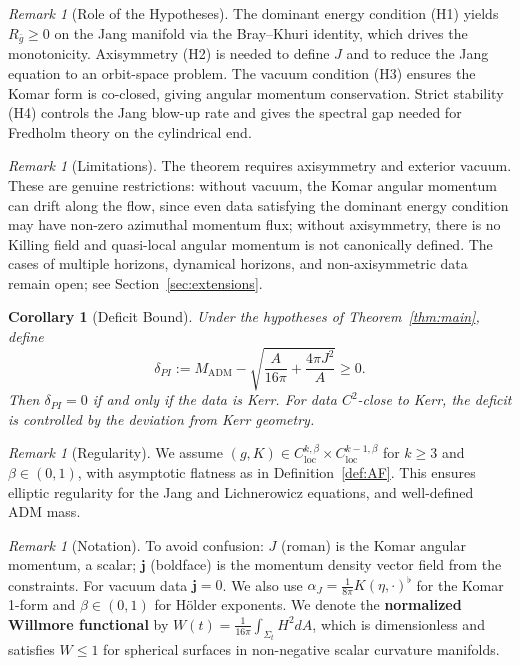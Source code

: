 \documentclass[12pt]{article}
\theoremstyle{plain}
\newtheorem{corollary}[theorem]{Corollary}
\theoremstyle{definition}
\theoremstyle{remark}
\newtheorem{remark}[theorem]{Remark}
\newcommand{\ADM}{\mathrm{ADM}}
\newcommand{\bg}{\bar{g}}
\newcommand{\momdens}{\boldsymbol{j}}
\begin{document}
\begin{remark}[Role of the Hypotheses]\label{rem:hypothesis-role}
The dominant energy condition (H1) yields $R_{\bg}\ge 0$ on the Jang manifold via the Bray--Khuri identity, which drives the monotonicity. Axisymmetry (H2) is needed to define $J$ and to reduce the Jang equation to an orbit-space problem. The vacuum condition (H3) ensures the Komar form is co-closed, giving angular momentum conservation. Strict stability (H4) controls the Jang blow-up rate and gives the spectral gap needed for Fredholm theory on the cylindrical end.
\end{remark}

\begin{remark}[Limitations]\label{rem:scope}
The theorem requires axisymmetry and exterior vacuum. These are genuine restrictions: without vacuum, the Komar angular momentum can drift along the flow, since even data satisfying the dominant energy condition may have non-zero azimuthal momentum flux; without axisymmetry, there is no Killing field and quasi-local angular momentum is not canonically defined. The cases of multiple horizons, dynamical horizons, and non-axisymmetric data remain open; see Section~\ref{sec:extensions}.
\end{remark}

\begin{corollary}[Deficit Bound]\label{cor:deficit}
Under the hypotheses of Theorem~\ref{thm:main}, define
\[
\delta_{PI} := M_{\ADM} - \sqrt{\frac{A}{16\pi} + \frac{4\pi J^2}{A}} \geq 0.
\]
Then $\delta_{PI} = 0$ if and only if the data is Kerr. For data $C^2$-close to Kerr, the deficit is controlled by the deviation from Kerr geometry.
\end{corollary}

\begin{remark}[Regularity]\label{rem:regularity}
We assume $(g, K) \in C^{k,\beta}_{\mathrm{loc}} \times C^{k-1,\beta}_{\mathrm{loc}}$ for $k \geq 3$ and $\beta \in (0,1)$, with asymptotic flatness as in Definition~\ref{def:AF}. This ensures elliptic regularity for the Jang and Lichnerowicz equations, and well-defined ADM mass.
\end{remark}

\begin{remark}[Notation]\label{rem:notation}
To avoid confusion: $J$ (roman) is the Komar angular momentum, a scalar; $\momdens$ (boldface) is the momentum density vector field from the constraints. For vacuum data $\momdens = 0$. We also use $\alpha_J = \frac{1}{8\pi}K(\eta, \cdot)^\flat$ for the Komar 1-form and $\beta \in (0,1)$ for H\"older exponents. We denote the \textbf{normalized Willmore functional} by $W(t) = \frac{1}{16\pi}\int_{\Sigma_t} H^2 dA$, which is dimensionless and satisfies $W \le 1$ for spherical surfaces in non-negative scalar curvature manifolds.
\end{remark}
\end{document}
